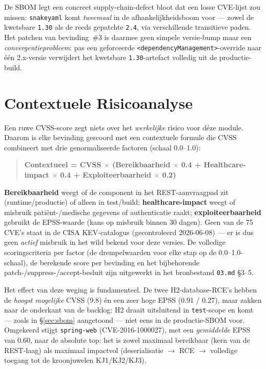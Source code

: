 \documentclass[12pt, a4paper]{report}
\begin{document}
De SBOM legt een concreet supply-chain-defect bloot dat een losse CVE-lijst zou
missen: \texttt{snakeyaml} komt \emph{tweemaal} in de afhankelijkheidsboom voor ---
zowel de kwetsbare \texttt{1.30} als de reeds gepatchte \texttt{2.4}, via
verschillende transitieve paden. Het patchen van bevinding~\#3 is daarmee geen
simpele versie-bump maar een \emph{convergentieprobleem}: pas een geforceerde
\texttt{<dependencyManagement>}-override naar één 2.x-versie verwijdert het
kwetsbare \texttt{1.30}-artefact volledig uit de productie-build.

\section{Contextuele Risicoanalyse}
\label{sec:contextuele-risico}

Een ruwe CVSS-score zegt niets over het \emph{werkelijke} risico voor déze module.
Daarom is elke bevinding gescoord met een contextuele formule die CVSS combineert
met drie genormaliseerde factoren (schaal 0.0--1.0):

\begin{quote}
\textbf{Contextueel = CVSS $\times$ (Bereikbaarheid $\times$ 0.4 +
Healthcare-impact $\times$ 0.4 + Exploiteerbaarheid $\times$ 0.2)}
\end{quote}

\textbf{Bereikbaarheid} weegt of de component in het REST-aanvraagpad zit
(runtime/productie) of alleen in test/build; \textbf{healthcare-impact} weegt of
misbruik patiënt-/medische gegevens of authenticatie raakt; \textbf{exploiteerbaarheid}
gebruikt de EPSS-waarde (kans op misbruik binnen 30 dagen). Geen van de 75 CVE's
staat in de CISA KEV-catalogus (gecontroleerd 2026-06-08) --- er is dus geen
\emph{actief} misbruik in het wild bekend voor deze versies. De volledige
scoringscriteria per factor (de drempelwaarden voor elke stap op de
0.0--1.0-schaal), de berekende score per bevinding en het bijbehorende
patch-/suppress-/accept-besluit zijn uitgewerkt in het bronbestand \texttt{03.md}
\S3--5.

Het effect van deze weging is fundamenteel. De twee H2-database-RCE's hebben de
\emph{hoogst mogelijke} CVSS (9.8) én een zeer hoge EPSS (0.91 / 0.27), maar zakken
naar de onderkant van de backlog: H2 draait uitsluitend in \texttt{test}-scope en
komt --- zoals in \S\ref{sec:sbom} aangetoond --- niet eens in de productie-SBOM
voor. Omgekeerd stijgt \texttt{spring-web} (CVE-2016-1000027), met een
\emph{gemiddelde} EPSS van 0.60, naar de absolute top: het is zowel maximaal
bereikbaar (kern van de REST-laag) als maximaal impactvol (deserialisatie
$\rightarrow$ RCE $\rightarrow$ volledige toegang tot de kroonjuwelen KJ1/KJ2/KJ3).
\end{document}
